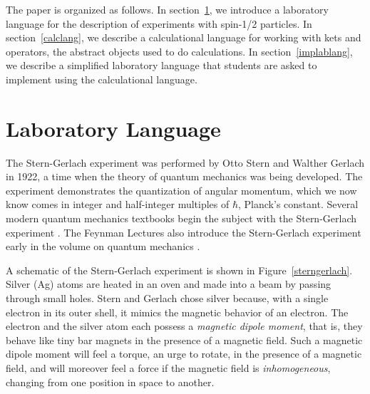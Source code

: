 \documentclass[12pt]{article}
\begin{document}
The paper is organized as follows.
In section~\ref{lablang}, we introduce a laboratory language
for the description of experiments with spin-1/2 particles.
In section~\ref{calclang}, we describe a calculational language
for working with kets and operators, the abstract objects
used to do calculations.
In section~\ref{implablang}, we describe a simplified laboratory
language that students are asked to implement using the
calculational language.

\section{Laboratory Language}
\label{lablang}

The Stern-Gerlach experiment was performed
by Otto Stern and Walther Gerlach in 1922, a time
when the theory of quantum mechanics was being developed.
The experiment demonstrates the quantization of angular
momentum, which we now know comes in integer and half-integer
multiples of $\hbar$, Planck's constant.
Several modern quantum mechanics textbooks begin the subject
with the Stern-Gerlach experiment \cite{schumacherwestmoreland,townsend,sakurainapolitano}.
The Feynman Lectures also introduce the Stern-Gerlach experiment
early in the volume on quantum mechanics \cite{feynmanlectures3}.

A schematic of the Stern-Gerlach experiment is shown in Figure~\ref{sterngerlach}.
Silver (Ag) atoms are heated in an oven and made into a beam by passing
through small holes.  Stern and Gerlach chose silver because, with a single
electron in its outer shell, it mimics the magnetic behavior of an electron.
The electron and the silver atom each possess a \emph{magnetic dipole moment},
that is, they behave like tiny bar magnets in the presence of a magnetic field.
Such a magnetic dipole moment will feel a torque, an urge to rotate, in the presence
of a magnetic field, and will moreover feel a force if the magnetic field
is \emph{inhomogeneous}, changing from one position in space to another.
\end{document}
